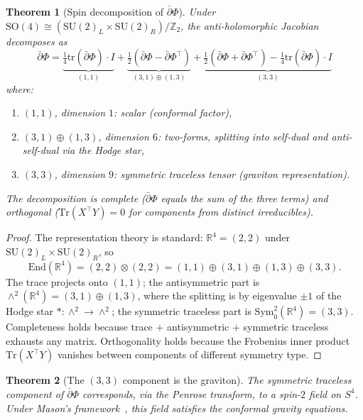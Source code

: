 \documentclass[11pt,a4paper]{article}
\newtheorem{theorem}{Theorem}[section]
\theoremstyle{definition}
\theoremstyle{remark}
\newcommand{\R}{\mathbb{R}}
\newcommand{\Z}{\mathbb{Z}}
\newcommand{\dbar}{\bar{\partial}}
\newcommand{\SU}{\mathrm{SU}}
\begin{document}
\begin{theorem}[Spin decomposition of $\dbar\Phi$]\label{thm:spin_decomp}
Under $\mathrm{SO}(4)\cong(\SU(2)_L\times\SU(2)_R)/\Z_2$, the anti-holomorphic Jacobian decomposes as
\begin{equation}\label{eq:spin_decomp}
\dbar\Phi=\underbrace{\tfrac{1}{4}\mathrm{tr}(\dbar\Phi)\cdot I}_{(1,1)}+\underbrace{\tfrac{1}{2}(\dbar\Phi-\dbar\Phi^\top)}_{(3,1)\oplus(1,3)}+\underbrace{\tfrac{1}{2}(\dbar\Phi+\dbar\Phi^\top)-\tfrac{1}{4}\mathrm{tr}(\dbar\Phi)\cdot I}_{(3,3)}
\end{equation}
where:
\begin{enumerate}[nosep]
\item $(1,1)$, dimension $1$: scalar (conformal factor),
\item $(3,1)\oplus(1,3)$, dimension $6$: two-forms, splitting into self-dual and anti-self-dual via the Hodge star,
\item $(3,3)$, dimension $9$: symmetric traceless tensor (graviton representation).
\end{enumerate}
The decomposition is complete ($\dbar\Phi$ equals the sum of the three terms) and orthogonal ($\mathrm{Tr}(X^\top Y)=0$ for components from distinct irreducibles).
\end{theorem}

\begin{proof}
The representation theory is standard: $\R^4=(2,2)$ under $\SU(2)_L\times\SU(2)_R$, so
\[
\mathrm{End}(\R^4)=(2,2)\otimes(2,2)=(1,1)\oplus(3,1)\oplus(1,3)\oplus(3,3).
\]
The trace projects onto $(1,1)$; the antisymmetric part is $\wedge^2(\R^4)=(3,1)\oplus(1,3)$, where the splitting is by eigenvalue $\pm 1$ of the Hodge star $\ast:\wedge^2\to\wedge^2$; the symmetric traceless part is $\mathrm{Sym}^2_0(\R^4)=(3,3)$. Completeness holds because trace $+$ antisymmetric $+$ symmetric traceless exhausts any matrix. Orthogonality holds because the Frobenius inner product $\mathrm{Tr}(X^\top Y)$ vanishes between components of different symmetry type.
\end{proof}

\begin{theorem}[The $(3,3)$ component is the graviton]\label{thm:graviton}
The symmetric traceless component of $\dbar\Phi$ corresponds, via the Penrose transform, to a spin-$2$ field on $S^4$. Under Mason's framework~\cite{Mason2005}, this field satisfies the conformal gravity equations.
\end{theorem}
\end{document}
